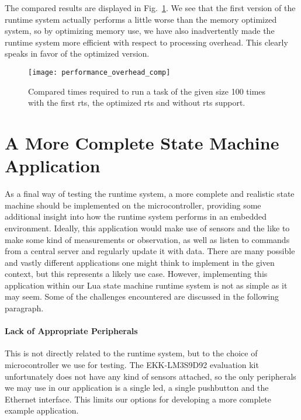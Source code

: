 \noindent
The compared results are displayed in Fig.~\ref{fig:performance_overhead_comp}. We see that the first version of the runtime system actually performs a little worse than the memory optimized system, so by optimizing memory use, we have also inadvertently made the runtime system more efficient with respect to processing overhead. This clearly speaks in favor of the optimized version.

\begin{figure}[htp]
	\centering
	\texttt{[image: performance\_overhead\_comp]}
	\caption[Results of performance comparison with the first version of the runtime system]{Compared times required to run a task of the given size 100 times with the first \gls{rts}, the optimized \gls{rts} and without \gls{rts} support.}
	\label{fig:performance_overhead_comp}
\end{figure}

\FloatBarrier
\section{A More Complete State Machine Application}
\label{sec:complete_app}
As a final way of testing the runtime system, a more complete and realistic state machine should be implemented on the microcontroller, providing some additional insight into how the runtime system performs in an embedded environment. Ideally, this application would make use of sensors and the like to make some kind of measurements or observation, as well as listen to commands from a central server and regularly update it with data. There are many possible and vastly different applications one might think to implement in the given context, but this represents a likely use case. However, implementing this application within our Lua state machine runtime system is not as simple as it may seem. Some of the challenges encountered are discussed in the following paragraph.

\paragraph{Lack of Appropriate Peripherals} This is not directly related to the runtime system, but to the choice of microcontroller we use for testing. The EKK-LM3S9D92 evaluation kit unfortunately does not have any kind of sensors attached, so the only peripherals we may use in our application is a single \gls{led}, a single pushbutton and the Ethernet interface. This limits our options for developing a more complete example application.

